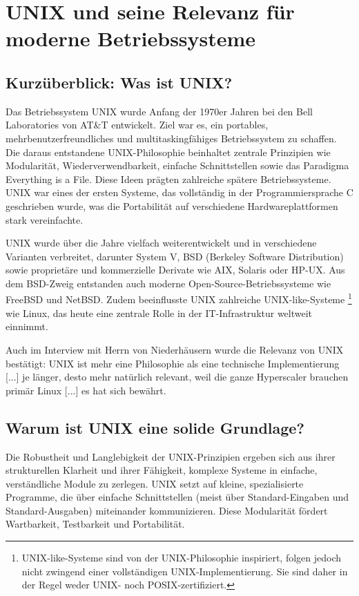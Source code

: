 \section{UNIX und seine Relevanz für moderne Betriebssysteme}


\subsection{Kurzüberblick: Was ist UNIX?}

Das Betriebssystem UNIX wurde Anfang der 1970er Jahren bei den Bell Laboratories von AT\&T entwickelt. Ziel war es, ein portables, mehrbenutzerfreundliches und multitaskingfähiges Betriebssystem zu schaffen. Die daraus entstandene UNIX-Philosophie beinhaltet zentrale Prinzipien wie Modularität, Wiederverwendbarkeit, einfache Schnittstellen sowie das Paradigma \glqq Everything is a File\grqq. Diese Ideen prägten zahlreiche spätere Betriebssysteme. UNIX war eines der ersten Systeme, das vollständig in der Programmiersprache C geschrieben wurde, was die Portabilität auf verschiedene Hardwareplattformen stark vereinfachte.

UNIX wurde über die Jahre vielfach weiterentwickelt und in verschiedene Varianten verbreitet, darunter System V, BSD (Berkeley Software Distribution) sowie proprietäre und kommerzielle Derivate wie AIX, Solaris oder HP-UX. Aus dem BSD-Zweig entstanden auch moderne Open-Source-Betriebssysteme wie FreeBSD und NetBSD. Zudem beeinflusste UNIX zahlreiche \glqq UNIX-like\grqq-Systeme \footnote{UNIX-like-Systeme sind von der UNIX-Philosophie inspiriert, folgen jedoch nicht zwingend einer vollständigen UNIX-Implementierung. Sie sind daher in der Regel weder UNIX- noch POSIX-zertifiziert.} wie Linux, das heute eine zentrale Rolle in der IT-Infrastruktur weltweit einnimmt.

Auch im Interview mit Herrn von Niederhäusern wurde die Relevanz von UNIX bestätigt: \glqq UNIX ist mehr eine Philosophie als eine technische Implementierung [...] je länger, desto mehr natürlich relevant, weil die ganze Hyperscaler brauchen primär Linux [...] es hat sich bewährt.\grqq \ \cite{interviewNH}


\subsection{Warum ist UNIX eine solide Grundlage?}

Die Robustheit und Langlebigkeit der UNIX-Prinzipien ergeben sich aus ihrer strukturellen Klarheit und ihrer Fähigkeit, komplexe Systeme in einfache, verständliche Module zu zerlegen. UNIX setzt auf kleine, spezialisierte Programme, die über einfache Schnittstellen (meist über Standard-Eingaben und Standard-Ausgaben) miteinander kommunizieren. Diese Modularität fördert Wartbarkeit, Testbarkeit und Portabilität.

